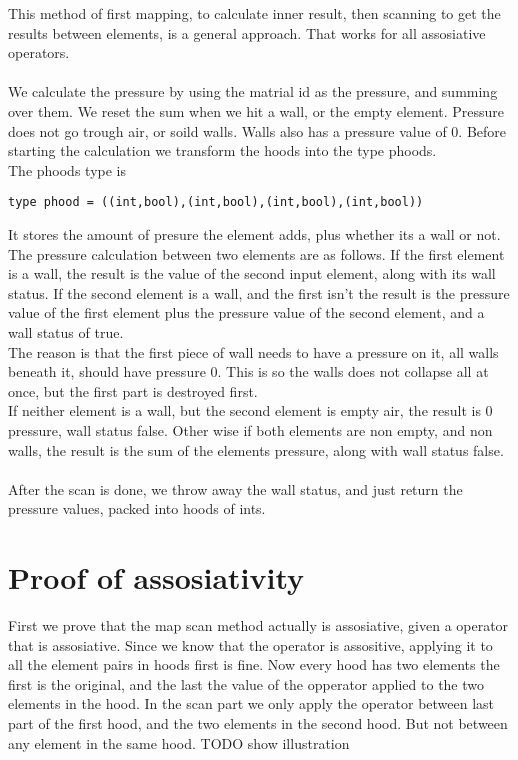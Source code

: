\documentclass[11pt]{report}
\begin{document}
This method of first mapping, to calculate inner result, then scanning to get the results between elements, is a general approach. That works for all assosiative operators.
\\
\\
We calculate the pressure by using the matrial id as the pressure, and summing over them. We reset the sum when we hit a wall, or the empty element. Pressure does not go trough air, or soild walls. Walls also has a pressure value of 0.
Before starting the calculation we transform the hoods into the type phoods.
\\
The phoods type is
\begin{lstlisting}
type phood = ((int,bool),(int,bool),(int,bool),(int,bool))
\end{lstlisting}
It stores the amount of presure the element adds, plus whether its a wall or not. The pressure calculation between two elements are as follows. If the first element is a wall, the result is the value of the second input element, along with its wall status. If the second element is a wall, and the first isn't the result is the pressure value of the first element plus the pressure value of the second element, and a wall status of true.
\\
The reason is that the first piece of wall needs to have a pressure on it, all walls beneath it, should have pressure 0. This is so the walls does not collapse all at once, but the first part is destroyed first.
\\
If neither element is a wall, but the second element is empty air, the result is 0 pressure, wall status false. Other wise if both elements are non empty, and non walls, the result is the sum of the elements pressure, along with wall status false.
\\
\\
After the scan is done, we throw away the wall status, and just return the pressure values, packed into hoods of ints.



\section{Proof of assosiativity}


First we prove that the map scan method actually is assosiative, given a operator that is assosiative. Since we know that the operator is assositive, applying it to all the element pairs in hoods first is fine. Now every hood has two elements the first is the original, and the last the value of the opperator applied to the two elements in the hood. In the scan part we only apply the operator between last part of the first hood, and the two elements in the second hood. But not between any element in the same hood. TODO show illustration
\\
\\
\end{document}
